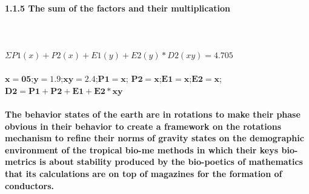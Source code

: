 \paragraph{1.1.5 The sum of the factors and their multiplication}
\textbf{\\\\}
$\Sigma{P1(x) + P2(x) + E1(y) + E2(y) * D2(xy) = 4.705}$
\textbf{\\\\}
$\mathbf{x = 05}$;\vspace{.25cm}$\mathbf{y = 1.9}$;\vspace{.25cm}$\mathbf{xy = 2.4}$;\vspace{.25cm}$\mathbf{P1 = x}$;\vspace{.25cm}
$\mathbf{P2 = x}$;\vspace{.25cm}$\mathbf{E1 = x}$;\vspace{.25cm}$\mathbf{E2 = x}$;
\vspace{.25cm}
$\mathbf{D2 = P1 + P2 + E1 + E2 * xy}$
\textbf{\\\\}
\textbf{The behavior states of the earth are in rotations to make their phase obvious in their behavior to create a framework on the rotations mechanism to refine their norms of gravity states on the demographic environment of the tropical bio-me methods in which their keys bio-metrics is about stability produced by the bio-poetics of mathematics that its calculations are on top of magazines for the formation of conductors.}
